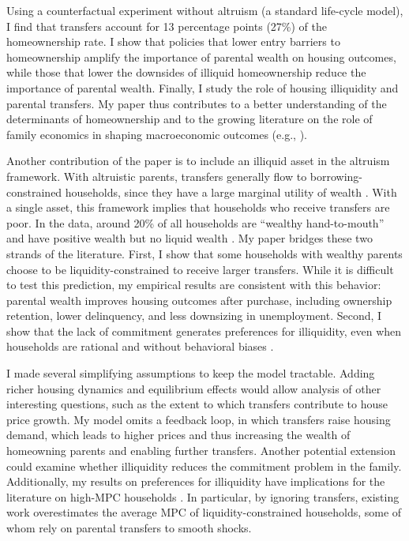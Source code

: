 \documentclass[12pt]{article}
\begin{document}
Using a counterfactual experiment without altruism (a standard life-cycle model), I find that transfers account for 13 percentage points (27\%) of the homeownership rate. I show that policies that lower entry barriers to homeownership amplify the importance of parental wealth on housing outcomes, while those that lower the downsides of illiquid homeownership reduce the importance of parental wealth. Finally, I study the role of housing illiquidity and parental transfers. My paper thus contributes to a better understanding of the determinants of homeownership and to the growing literature on the role of family economics in shaping macroeconomic outcomes (e.g., \cite{Doepke2016a,Daruich2018}).

Another contribution of the paper is to include an illiquid asset in the altruism framework. With altruistic parents, transfers generally flow to borrowing-constrained households, since they have a large marginal utility of wealth \citep{Barczyk2020,Chu2020}. With a single asset, this framework implies that households who receive transfers are poor. In the data, around 20\% of all households are ``wealthy hand-to-mouth'' and have positive wealth but no liquid wealth \citep{Kaplan2014a,Attanasio2018}. My paper bridges these two strands of the literature. First, I show that some households with wealthy parents choose to be liquidity-constrained to receive larger transfers. While it is difficult to test this prediction, my empirical results are consistent with this behavior: parental wealth improves housing outcomes after purchase, including ownership retention, lower delinquency, and less downsizing in unemployment. Second, I show that the lack of commitment generates preferences for illiquidity, even when households are rational and without behavioral biases \citep[see e.g.,][]{attanasio2024temptation}. 

I made several simplifying assumptions to keep the model tractable. Adding richer housing dynamics and equilibrium effects would allow analysis of other interesting questions, such as the extent to which transfers contribute to house price growth. My model omits a feedback loop, in which transfers raise housing demand, which leads to higher prices and thus increasing the wealth of homeowning parents and enabling further transfers. Another potential extension could examine whether illiquidity reduces the commitment problem in the family. Additionally, my results on preferences for illiquidity have implications for the literature on high-MPC households \citep[see e.g.,][]{kaplan2022marginal}. In particular, by ignoring transfers, existing work overestimates the average MPC of liquidity-constrained households, some of whom rely on parental transfers to smooth shocks. 
\end{document}
